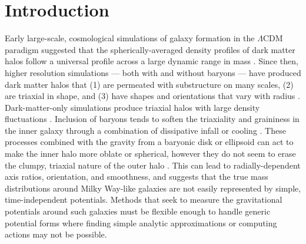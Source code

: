 \documentclass{emulateapj}
\begin{document}

\section{Introduction}\label{sec:intro}

Early large-scale, cosmological simulations of galaxy formation in the $\Lambda$CDM paradigm suggested that the spherically-averaged density profiles of dark matter halos follow a universal profile across a large dynamic range in mass \citep{navarro96}. Since then, higher resolution simulations --- both with and without baryons --- have produced dark matter halos that (1) are permeated with substructure on many scales, (2) are triaxial in shape, and (3) have shapes and orientations that vary with radius \citep{dubinski91, jing02, kuhlen07, veraciro11}. Dark-matter-only simulations produce triaxial halos \citep{jing02} with large density fluctuations \citep{zemp09}. Inclusion of baryons tends to soften the triaxiality and graininess in the inner galaxy through a combination of dissipative infall \citep{dubinski94} or cooling \citep{bryan13}. These processes combined with the gravity from a baryonic disk or ellipsoid can act to make the inner halo more oblate or spherical, however they do not seem to erase the clumpy, triaxial nature of the outer halo \citep[e.g.,][]{pontzen12}. This can lead to radially-dependent axis ratios, orientation, and smoothness, and suggests that the true mass distributions around Milky Way-like galaxies are not easily represented by simple, time-independent potentials. Methods that seek to measure the gravitational potentials around such galaxies must be flexible enough to handle generic potential forms where finding simple analytic approximations or computing actions may not be possible.
\end{document}
